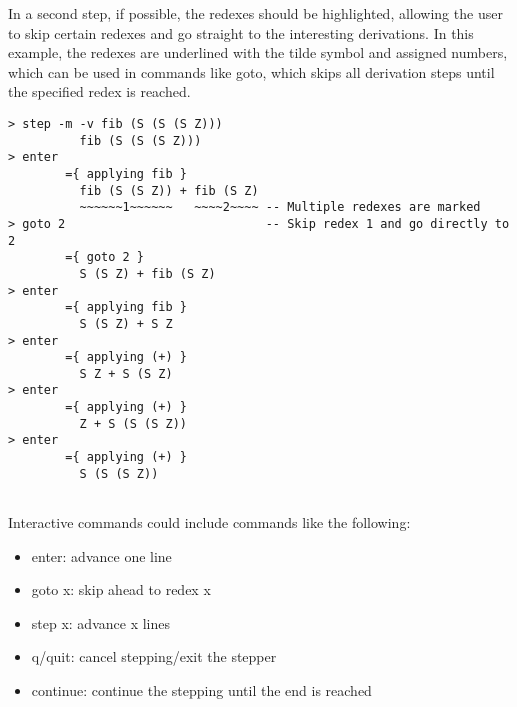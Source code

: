 In a second step, if possible, the redexes should be highlighted, allowing the user to skip certain redexes and go straight to the interesting derivations.
In this example, the redexes are underlined with the tilde symbol and assigned numbers, which can be used in commands like goto, which skips all derivation steps until the specified redex is reached.

\begin{verbatim}
> step -m -v fib (S (S (S Z)))
          fib (S (S (S Z)))
> enter
        ={ applying fib }
          fib (S (S Z)) + fib (S Z)
          ~~~~~~1~~~~~~   ~~~~2~~~~ -- Multiple redexes are marked
> goto 2                            -- Skip redex 1 and go directly to 2
        ={ goto 2 }
          S (S Z) + fib (S Z)
> enter
        ={ applying fib }
          S (S Z) + S Z
> enter
        ={ applying (+) }
          S Z + S (S Z)
> enter
        ={ applying (+) }
          Z + S (S (S Z))
> enter
        ={ applying (+) }
          S (S (S Z))
          
\end{verbatim}

Interactive commands could include commands like the following:
\begin{itemize}
    \item enter: advance one line
    \item goto x: skip ahead to redex x
    \item step x: advance x lines
    \item q/quit: cancel stepping/exit the stepper
    \item continue: continue the stepping until the end is reached
\end{itemize}